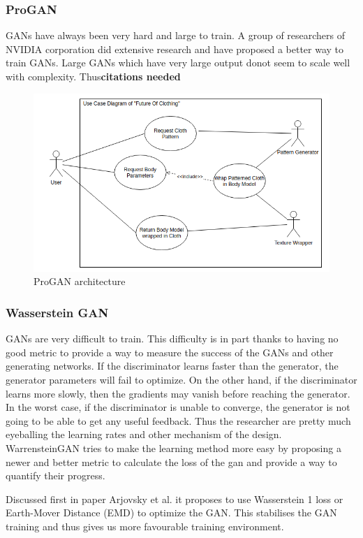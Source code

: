 \documentclass{article}
\begin{document}
\subsubsection{ProGAN}
GANs have always been very hard and large to train. A group of researchers of NVIDIA corporation did extensive research and have proposed a better way to train GANs. Large GANs which have very large output donot seem to scale well with complexity. Thus\textbf{citations needed}
\begin{figure}[h]
    \includegraphics[scale=0.5]{images/softwareDiagrams/FinalSystemUseCase.png}
    \centering
    \caption{ProGAN architecture}    
\end{figure}

\subsubsection{Wasserstein GAN}
GANs are very difficult to train. This difficulty is in part thanks to having no good metric to provide a way to measure the success of the GANs and other generating networks. If the discriminator learns faster than the generator, the generator parameters will fail to optimize. On the other hand, if the discriminator learns more slowly, then the gradients may vanish before reaching the generator.
In the worst case, if the discriminator is unable to converge, the generator is not going to be able to get any useful feedback. Thus the researcher are pretty much eyeballing the learning rates and other mechanism of the design. WarrensteinGAN tries to make the learning method more easy by proposing a newer and better metric to calculate the loss of the gan and provide a way to quantify their progress.

Discussed first in paper \cite{arjovsky2017wasserstein}  Arjovsky et al. it proposes to use Wasserstein 1 loss or Earth-Mover Distance (EMD) to optimize the GAN. This stabilises the GAN training and thus gives us more favourable training environment.
\end{document}
